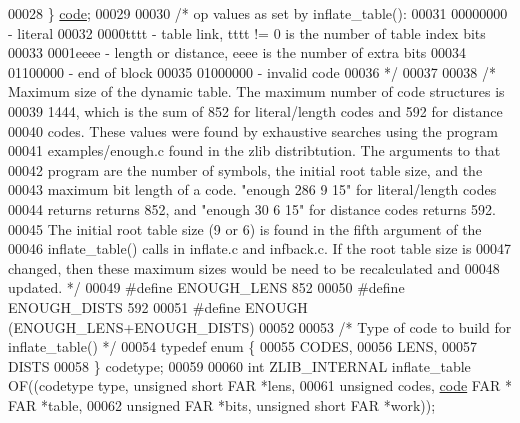 \begin{DoxyCode}
00028 \} \hyperlink{structcode}{code};
00029 
00030 \textcolor{comment}{/* op values as set by inflate\_table():}
00031 \textcolor{comment}{    00000000 - literal}
00032 \textcolor{comment}{    0000tttt - table link, tttt != 0 is the number of table index bits}
00033 \textcolor{comment}{    0001eeee - length or distance, eeee is the number of extra bits}
00034 \textcolor{comment}{    01100000 - end of block}
00035 \textcolor{comment}{    01000000 - invalid code}
00036 \textcolor{comment}{ */}
00037 
00038 \textcolor{comment}{/* Maximum size of the dynamic table.  The maximum number of code structures is}
00039 \textcolor{comment}{   1444, which is the sum of 852 for literal/length codes and 592 for distance}
00040 \textcolor{comment}{   codes.  These values were found by exhaustive searches using the program}
00041 \textcolor{comment}{   examples/enough.c found in the zlib distribtution.  The arguments to that}
00042 \textcolor{comment}{   program are the number of symbols, the initial root table size, and the}
00043 \textcolor{comment}{   maximum bit length of a code.  "enough 286 9 15" for literal/length codes}
00044 \textcolor{comment}{   returns returns 852, and "enough 30 6 15" for distance codes returns 592.}
00045 \textcolor{comment}{   The initial root table size (9 or 6) is found in the fifth argument of the}
00046 \textcolor{comment}{   inflate\_table() calls in inflate.c and infback.c.  If the root table size is}
00047 \textcolor{comment}{   changed, then these maximum sizes would be need to be recalculated and}
00048 \textcolor{comment}{   updated. */}
00049 \textcolor{preprocessor}{#define ENOUGH\_LENS 852}
00050 \textcolor{preprocessor}{#define ENOUGH\_DISTS 592}
00051 \textcolor{preprocessor}{#define ENOUGH (ENOUGH\_LENS+ENOUGH\_DISTS)}
00052 
00053 \textcolor{comment}{/* Type of code to build for inflate\_table() */}
00054 \textcolor{keyword}{typedef} \textcolor{keyword}{enum} \{
00055     CODES,
00056     LENS,
00057     DISTS
00058 \} codetype;
00059 
00060 \textcolor{keywordtype}{int} ZLIB\_INTERNAL inflate\_table OF((codetype type, \textcolor{keywordtype}{unsigned} \textcolor{keywordtype}{short} FAR *lens,
00061                              \textcolor{keywordtype}{unsigned} codes, \hyperlink{structcode}{code} FAR * FAR *table,
00062                              \textcolor{keywordtype}{unsigned} FAR *bits, \textcolor{keywordtype}{unsigned} \textcolor{keywordtype}{short} FAR *work));
\end{DoxyCode}
